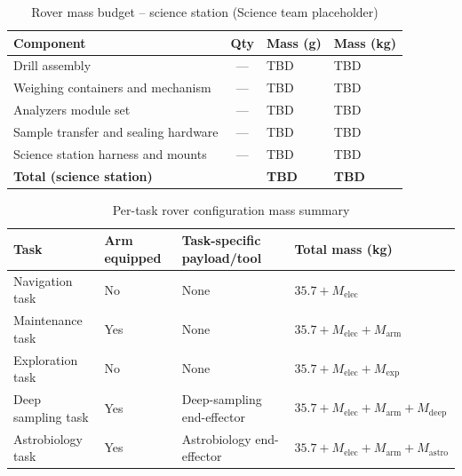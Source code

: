 \begin{table}[H]
\centering
\caption{Rover mass budget -- science station (Science team placeholder)}
\label{tab:mass_budget_science_placeholder}
\setlength{\tabcolsep}{7pt}
\begin{tabular}{@{}
  l
  S[table-format=2.0]
  l
  l
  @{}}
\toprule
\textbf{Component} &
\textbf{Qty} &
\textbf{Mass (g)} &
\textbf{Mass (kg)} \\
\midrule
Drill assembly                       & {---} & TBD & TBD \\
Weighing containers and mechanism    & {---} & TBD & TBD \\
Analyzers module set                 & {---} & TBD & TBD \\
Sample transfer and sealing hardware & {---} & TBD & TBD \\
Science station harness and mounts   & {---} & TBD & TBD \\
\midrule
\textbf{Total (science station)}
  & & \textbf{TBD} & \textbf{TBD} \\
\bottomrule
\end{tabular}
\end{table}

\begin{table}[H]
\centering
\caption{Per-task rover configuration mass summary}
\label{tab:mass_budget_per_task_configuration}
\begin{tabular}{@{}L{3.4cm} C{1.8cm} L{4.2cm} L{5.2cm}@{}}
\toprule
\textbf{Task} & \textbf{Arm equipped} & \textbf{Task-specific payload/tool} & \textbf{Total mass (kg)} \\
\midrule
Navigation task   & No  & None & $35.7 + M_{\mathrm{elec}}$ \\
Maintenance task  & Yes & None & $35.7 + M_{\mathrm{elec}} + M_{\mathrm{arm}}$ \\
Exploration task  & No  & None & $35.7 + M_{\mathrm{elec}} + M_{\mathrm{exp}}$ \\
Deep sampling task & Yes & Deep-sampling end-effector & $35.7 + M_{\mathrm{elec}} + M_{\mathrm{arm}} + M_{\mathrm{deep}}$ \\
Astrobiology task & Yes & Astrobiology end-effector & $35.7 + M_{\mathrm{elec}} + M_{\mathrm{arm}} + M_{\mathrm{astro}}$ \\
\bottomrule
\end{tabular}
\end{table}

